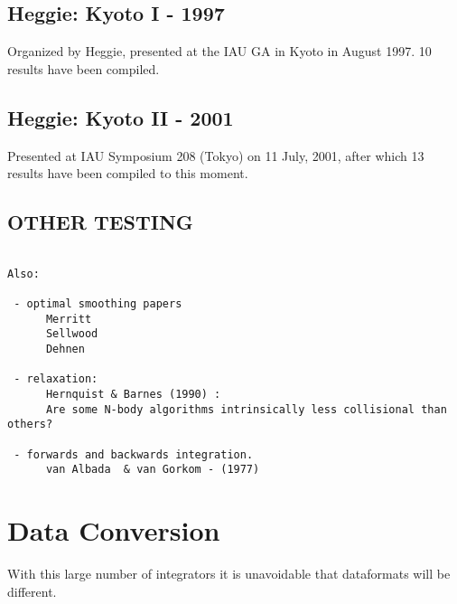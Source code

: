 \section{Heggie: Kyoto I - 1997}

Organized by Heggie, presented at the IAU GA in Kyoto in August 1997. 10 results
have been compiled.

\section{Heggie: Kyoto II - 2001}

Presented at IAU Symposium 208 (Tokyo) on 11 July, 2001, after which 13 results
have been compiled to this moment.

\section{OTHER TESTING}
\begin{verbatim}

Also:

 - optimal smoothing papers
      Merritt
      Sellwood
      Dehnen

 - relaxation:
      Hernquist & Barnes (1990) : 
      Are some N-body algorithms intrinsically less collisional than others?

 - forwards and backwards integration. 
      van Albada  & van Gorkom - (1977)

\end{verbatim}

\chapter                {Data Conversion}

With this large number of integrators it is unavoidable that dataformats
will be different.


